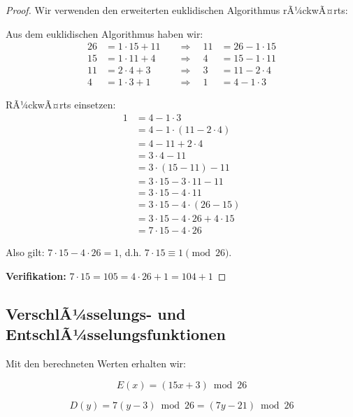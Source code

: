 ﻿\documentclass[12pt,a4paper]{article}
\begin{document}
	\begin{proof}
		Wir verwenden den erweiterten euklidischen Algorithmus rÃ¼ckwÃ¤rts:
		
		Aus dem euklidischen Algorithmus haben wir:
		\begin{align}
			26 &= 1 \cdot 15 + 11 \quad &\Rightarrow \quad 11 &= 26 - 1 \cdot 15 \\
			15 &= 1 \cdot 11 + 4 \quad &\Rightarrow \quad 4 &= 15 - 1 \cdot 11 \\
			11 &= 2 \cdot 4 + 3 \quad &\Rightarrow \quad 3 &= 11 - 2 \cdot 4 \\
			4 &= 1 \cdot 3 + 1 \quad &\Rightarrow \quad 1 &= 4 - 1 \cdot 3
		\end{align}
		
		RÃ¼ckwÃ¤rts einsetzen:
		\begin{align}
			1 &= 4 - 1 \cdot 3 \\
			&= 4 - 1 \cdot (11 - 2 \cdot 4) \\
			&= 4 - 11 + 2 \cdot 4 \\
			&= 3 \cdot 4 - 11 \\
			&= 3 \cdot (15 - 11) - 11 \\
			&= 3 \cdot 15 - 3 \cdot 11 - 11 \\
			&= 3 \cdot 15 - 4 \cdot 11 \\
			&= 3 \cdot 15 - 4 \cdot (26 - 15) \\
			&= 3 \cdot 15 - 4 \cdot 26 + 4 \cdot 15 \\
			&= 7 \cdot 15 - 4 \cdot 26
		\end{align}
		
		Also gilt: $7 \cdot 15 - 4 \cdot 26 = 1$, d.h. $7 \cdot 15 \equiv 1 \pmod{26}$.
		
		\textbf{Verifikation:} $7 \cdot 15 = 105 = 4 \cdot 26 + 1 = 104 + 1$ \checkmark
	\end{proof}
	
	\subsection{VerschlÃ¼sselungs- und EntschlÃ¼sselungsfunktionen}
	
	Mit den berechneten Werten erhalten wir:
	
	\begin{equation}
		\boxed{E(x) = (15x + 3) \bmod 26}
	\end{equation}
	
	\begin{equation}
		\boxed{D(y) = 7(y - 3) \bmod 26 = (7y - 21) \bmod 26}
	\end{equation}
	
\end{document}
